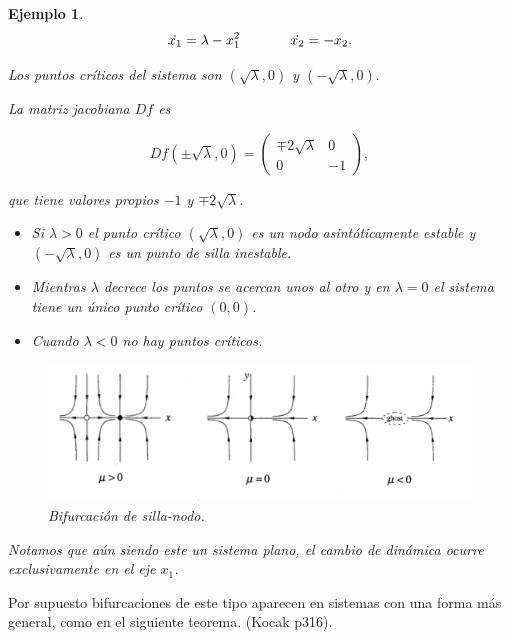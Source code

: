 \documentclass[11pt]{book}
\theoremstyle{definition}
\numberwithin{definition}{section}
\theoremstyle{theorem}
\numberwithin{theorem}{section}
\numberwithin{lemma}{section}
\numberwithin{corollary}{section}
\theoremstyle{plain}
\newtheorem{example}{Ejemplo}
\numberwithin{example}{section}
\begin{document}
\begin{example}
$$ 
	\dot{x_1} = \lambda - x_1^2 \hspace{0.5in} \dot{x_2} = -x_2.
$$

Los puntos críticos del sistema son $(\sqrt{\lambda}, 0)$ y $(-\sqrt{\lambda}, 0).$

La matriz jacobiana $Df$ es

$$
Df(\pm \sqrt{\lambda}, 0) = \left( \begin{array}{ll}
	\mp 2 \sqrt{\lambda} & 0 \\
	0 & -1
\end{array} \right),
$$

que tiene valores propios $-1$ y $\mp 2\sqrt{\lambda}$.

\begin{itemize}
	\item Si $\lambda > 0$ el punto crítico $(\sqrt{\lambda}, 0)$ es un nodo asintóticamente estable y $(-\sqrt{\lambda}, 0)$ es un punto de silla inestable.
	\item Mientras $\lambda$ decrece los puntos se acercan unos al otro y en $\lambda = 0$ el sistema tiene un único punto crítico $(0,0)$.
	\item Cuando $\lambda < 0$ no hay puntos críticos.
\end{itemize}

\begin{figure}[ht] \centering
    \includegraphics[scale=0.8]{figures/bifurcations-saddlenode.png}    
    \caption{Bifurcación de silla-nodo.}
\end{figure}

Notamos que aún siendo este un sistema plano, el cambio de dinámica ocurre exclusivamente en el eje $x_1$.
\end{example}

Por supuesto bifurcaciones de este tipo aparecen en sistemas con una forma más general, como en el siguiente teorema. (Kocak p316).
\end{document}
